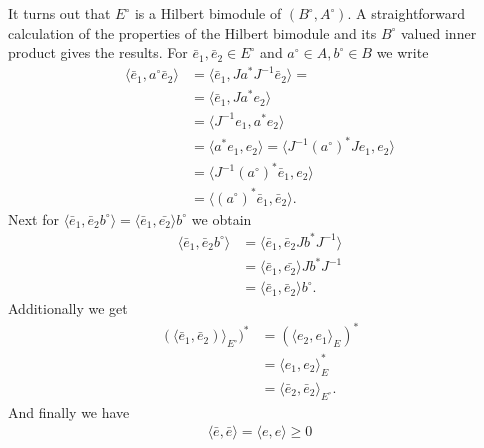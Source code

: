 It turns out that $E^\circ$ is a Hilbert bimodule
of $(B^{\circ}, A^{\circ})$. A straightforward calculation of the properties of the Hilbert bimodule and its $B^{\circ}$
valued inner product gives the results. For $\bar{e}_1, \bar{e}_2 \in E^{\circ}$ and $a^\circ \in A,
b^\circ \in B$ we write
\begin{align}
    \langle\bar{e}_1, a^\circ \bar{e}_2\rangle &= \langle\bar{e}_1, Ja^*J^{-1}
    \bar{e}_2\rangle=\nonumber\\
    &= \langle\bar{e}_1 , J a^* e_2\rangle \nonumber \\
    &= \langle J^{-1} e_1, a^* e_2\rangle \nonumber\\
    & = \langle a^* e_1, e_2\rangle= \langle J^{-1}(a^\circ)^* J e_1, e_2\rangle  \nonumber\\
    & = \langle J^{-1} (a^\circ)^* \bar{e}_1, e_2\rangle \nonumber\\
    & = \langle (a^\circ)^* \bar{e}_1 , \bar{e}_2\rangle.
\end{align}
Next for $\langle\bar{e}_1, \bar{e}_2 b^\circ\rangle = \langle\bar{e}_1,
\bar{e_2}\rangle b^\circ$ we obtain
\begin{align}
    \langle\bar{e}_1, \bar{e}_2 b^\circ\rangle  &= \langle\bar{e}_1, \bar{e}_2 Jb^*J^{-1}\rangle
    \nonumber\\
    &= \langle\bar{e}_1, \bar{e_2}\rangle Jb^*J^{-1} \nonumber \\
    &= \langle\bar{e}_1, \bar{e}_2\rangle b^\circ.
\end{align}
Additionally we get
\begin{align}
    (\langle\bar{e}_1, \bar{e}_2)\rangle_{E^\circ})^* &= (\langle e_2, e_1\rangle_E)^*\nonumber\\
                                          &= \langle e_1, e_2\rangle_E^* \nonumber\\
                                          &= \langle\bar{e}_2, \bar{e}_2\rangle_{E^\circ}.
\end{align}
And finally we have
\begin{align}
    \langle\bar{e}, \bar{e}\rangle = \langle e, e\rangle \geq 0
\end{align}

